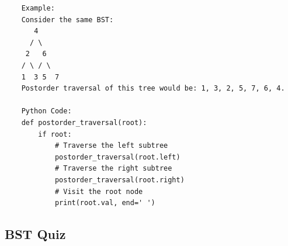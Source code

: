 \documentclass{article}
\begin{document}
\begin{verbatim}
    Example:
    Consider the same BST:
       4
      / \
     2   6
    / \ / \
    1  3 5  7
    Postorder traversal of this tree would be: 1, 3, 2, 5, 7, 6, 4.

    Python Code:
    def postorder_traversal(root):
        if root:
            # Traverse the left subtree
            postorder_traversal(root.left)
            # Traverse the right subtree
            postorder_traversal(root.right)
            # Visit the root node
            print(root.val, end=' ')
\end{verbatim}


\subsection{BST Quiz}
\end{document}
